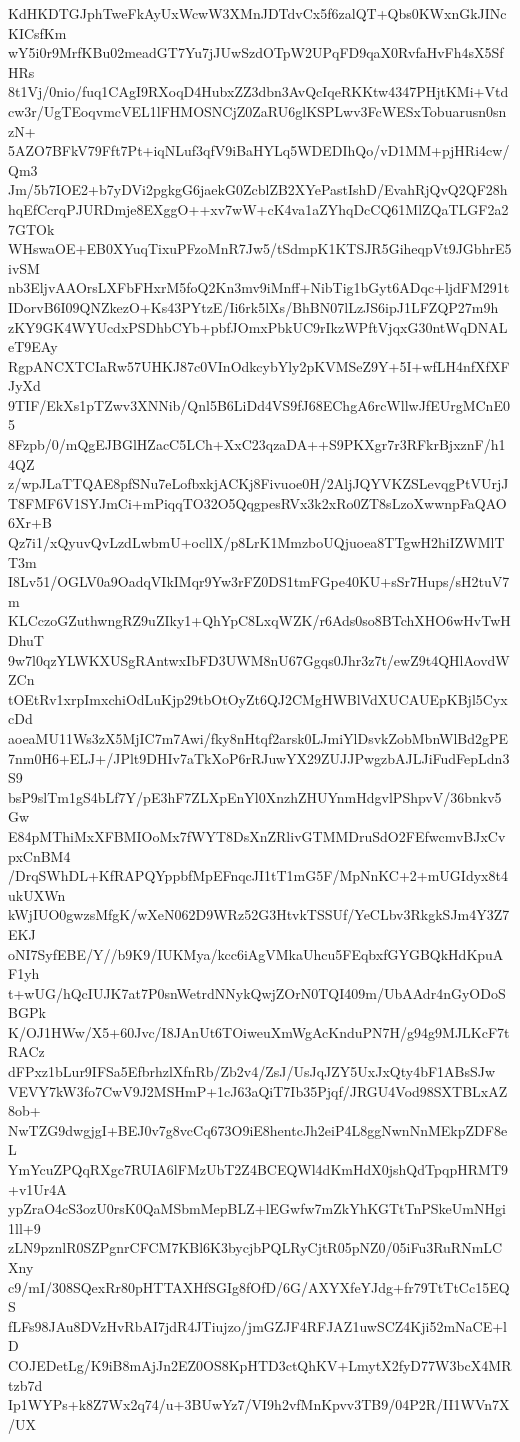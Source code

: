 KdHKDTGJphTweFkAyUxWcwW3XMnJDTdvCx5f6zalQT+Qbs0KWxnGkJINcKICsfKm
wY5i0r9MrfKBu02meadGT7Yu7jJUwSzdOTpW2UPqFD9qaX0RvfaHvFh4sX5SfHRs
8t1Vj/0nio/fuq1CAgI9RXoqD4HubxZZ3dbn3AvQcIqeRKKtw4347PHjtKMi+Vtd
cw3r/UgTEoqvmcVEL1lFHMOSNCjZ0ZaRU6glKSPLwv3FcWESxTobuarusn0snzN+
5AZO7BFkV79Fft7Pt+iqNLuf3qfV9iBaHYLq5WDEDIhQo/vD1MM+pjHRi4cw/Qm3
Jm/5b7IOE2+b7yDVi2pgkgG6jaekG0ZcblZB2XYePastIshD/EvahRjQvQ2QF28h
hqEfCcrqPJURDmje8EXggO++xv7wW+cK4va1aZYhqDcCQ61MlZQaTLGF2a27GTOk
WHswaOE+EB0XYuqTixuPFzoMnR7Jw5/tSdmpK1KTSJR5GiheqpVt9JGbhrE5ivSM
nb3EljvAAOrsLXFbFHxrM5foQ2Kn3mv9iMnff+NibTig1bGyt6ADqc+ljdFM291t
IDorvB6I09QNZkezO+Ks43PYtzE/Ii6rk5lXs/BhBN07lLzJS6ipJ1LFZQP27m9h
zKY9GK4WYUcdxPSDhbCYb+pbfJOmxPbkUC9rIkzWPftVjqxG30ntWqDNALeT9EAy
RgpANCXTCIaRw57UHKJ87c0VInOdkcybYly2pKVMSeZ9Y+5I+wfLH4nfXfXFJyXd
9TIF/EkXs1pTZwv3XNNib/Qnl5B6LiDd4VS9fJ68EChgA6rcWllwJfEUrgMCnE05
8Fzpb/0/mQgEJBGlHZacC5LCh+XxC23qzaDA++S9PKXgr7r3RFkrBjxznF/h14QZ
z/wpJLaTTQAE8pfSNu7eLofbxkjACKj8Fivuoe0H/2AljJQYVKZSLevqgPtVUrjJ
T8FMF6V1SYJmCi+mPiqqTO32O5QqgpesRVx3k2xRo0ZT8sLzoXwwnpFaQAO6Xr+B
Qz7i1/xQyuvQvLzdLwbmU+ocllX/p8LrK1MmzboUQjuoea8TTgwH2hiIZWMlTT3m
I8Lv51/OGLV0a9OadqVIkIMqr9Yw3rFZ0DS1tmFGpe40KU+sSr7Hups/sH2tuV7m
KLCczoGZuthwngRZ9uZIky1+QhYpC8LxqWZK/r6Ads0so8BTchXHO6wHvTwHDhuT
9w7l0qzYLWKXUSgRAntwxIbFD3UWM8nU67Ggqs0Jhr3z7t/ewZ9t4QHlAovdWZCn
tOEtRv1xrpImxchiOdLuKjp29tbOtOyZt6QJ2CMgHWBlVdXUCAUEpKBjl5CyxcDd
aoeaMU11Ws3zX5MjIC7m7Awi/fky8nHtqf2arsk0LJmiYlDsvkZobMbnWlBd2gPE
7nm0H6+ELJ+/JPlt9DHIv7aTkXoP6rRJuwYX29ZUJJPwgzbAJLJiFudFepLdn3S9
bsP9slTm1gS4bLf7Y/pE3hF7ZLXpEnYl0XnzhZHUYnmHdgvlPShpvV/36bnkv5Gw
E84pMThiMxXFBMIOoMx7fWYT8DsXnZRlivGTMMDruSdO2FEfwcmvBJxCvpxCnBM4
/DrqSWhDL+KfRAPQYppbfMpEFnqcJI1tT1mG5F/MpNnKC+2+mUGIdyx8t4ukUXWn
kWjIUO0gwzsMfgK/wXeN062D9WRz52G3HtvkTSSUf/YeCLbv3RkgkSJm4Y3Z7EKJ
oNI7SyfEBE/Y//b9K9/IUKMya/kcc6iAgVMkaUhcu5FEqbxfGYGBQkHdKpuAF1yh
t+wUG/hQcIUJK7at7P0snWetrdNNykQwjZOrN0TQI409m/UbAAdr4nGyODoSBGPk
K/OJ1HWw/X5+60Jvc/I8JAnUt6TOiweuXmWgAcKnduPN7H/g94g9MJLKcF7tRACz
dFPxz1bLur9IFSa5EfbrhzlXfnRb/Zb2v4/ZsJ/UsJqJZY5UxJxQty4bF1ABsSJw
VEVY7kW3fo7CwV9J2MSHmP+1cJ63aQiT7Ib35Pjqf/JRGU4Vod98SXTBLxAZ8ob+
NwTZG9dwgjgI+BEJ0v7g8vcCq673O9iE8hentcJh2eiP4L8ggNwnNnMEkpZDF8eL
YmYcuZPQqRXgc7RUIA6lFMzUbT2Z4BCEQWl4dKmHdX0jshQdTpqpHRMT9+v1Ur4A
ypZraO4cS3ozU0rsK0QaMSbmMepBLZ+lEGwfw7mZkYhKGTtTnPSkeUmNHgi1ll+9
zLN9pznlR0SZPgnrCFCM7KBl6K3bycjbPQLRyCjtR05pNZ0/05iFu3RuRNmLCXny
c9/mI/308SQexRr80pHTTAXHfSGIg8fOfD/6G/AXYXfeYJdg+fr79TtTtCc15EQS
fLFs98JAu8DVzHvRbAI7jdR4JTiujzo/jmGZJF4RFJAZ1uwSCZ4Kji52mNaCE+lD
COJEDetLg/K9iB8mAjJn2EZ0OS8KpHTD3ctQhKV+LmytX2fyD77W3bcX4MRtzb7d
Ip1WYPs+k8Z7Wx2q74/u+3BUwYz7/VI9h2vfMnKpvv3TB9/04P2R/II1WVn7X/UX
